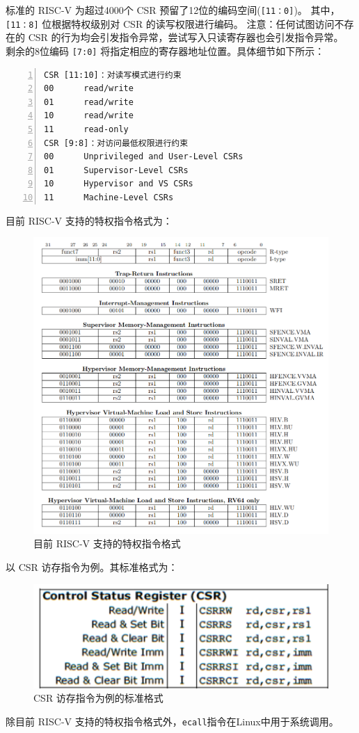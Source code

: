 \documentclass{../runikraft-report}
\begin{document}
标准的 RISC-V 为超过4000个 CSR 预留了12位的编码空间(\texttt{[11：0]})。
其中，\texttt{[11：8]} 位根据特权级别对 CSR 的读写权限进行编码。
注意：任何试图访问不存在的 CSR 的行为均会引发指令异常，尝试写入只读寄存器也会引发指令异常。
剩余的8位编码 \texttt{[7:0]} 将指定相应的寄存器地址位置。具体细节如下所示：\cite{b}\cite{c}

\begin{lstlisting}[numbers=left]
CSR [11:10]：对读写模式进行约束
00		read/write
01		read/write
10		read/write
11		read-only
CSR [9:8]：对访问最低权限进行约束
00		Unprivileged and User-Level CSRs
01		Supervisor-Level CSRs
10		Hypervisor and VS CSRs
11		Machine-Level CSRs
\end{lstlisting}


目前 RISC-V 支持的特权指令格式为：
\begin{figure}[H]
	\centering
	\includegraphics[width=0.7\linewidth]{assets/W2}
	\caption{目前 RISC-V 支持的特权指令格式}
	\label{fig:w2}
\end{figure}
以 CSR 访存指令为例。其标准格式为：
\begin{figure}[H]
	\centering
	\includegraphics[width=0.7\linewidth]{assets/W3}
	\caption{ CSR 访存指令为例的标准格式}
	\label{fig:w3}
\end{figure}
除目前 RISC-V 支持的特权指令格式外，\texttt{ecall}指令在Linux中用于系统调用。
\end{document}

